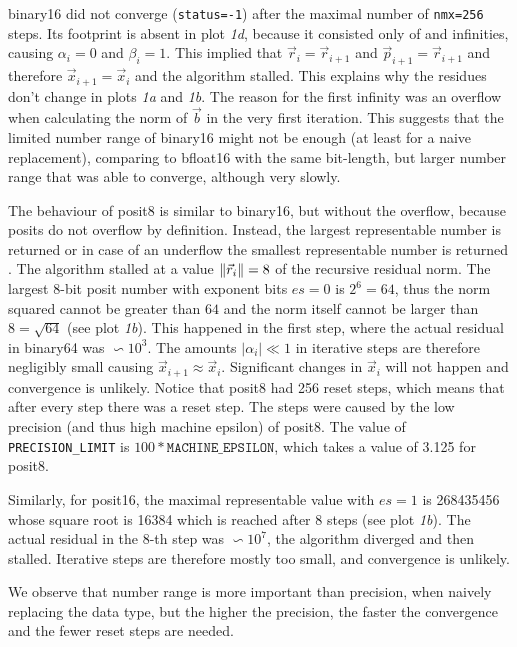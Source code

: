 \documentclass{article}
\theoremstyle{plain} %
\theoremstyle{convention} %
\theoremstyle{remark} %
\def\code#1{\texttt{#1}}
\numberwithin{equation}{section}
\begin{document}
\gls{binary16} did not converge (\code{status=-1}) after the maximal number of \code{nmx=256} steps. Its footprint is absent in plot \textit{1d}, because it consisted only of  and infinities, causing $\alpha_i = 0$ and $\beta_i = 1$. This implied that $\vec{r}_i = \vec{r}_{i+1}$ and $\vec{p}_{i+1} = \vec{r}_{i+1}$ and therefore $\vec{x}_{i+1} = \vec{x}_{i}$ and the algorithm stalled. This explains why the residues don't change in plots \textit{1a} and \textit{1b}. The reason for the first infinity was an overflow when calculating the norm of $\vec{b}$ in the very first iteration. This suggests that the limited number range of \gls{binary16} might not be enough (at least for a naive replacement), comparing to \gls{bfloat16} with the same bit-length, but larger number range that was able to converge, although very slowly.

The behaviour of \gls{posit8} is similar to \gls{binary16}, but without the overflow, because posits do not overflow by definition. Instead, the largest representable number is returned or in case of an underflow the smallest representable number is returned \cite{posit2018standard}. The algorithm stalled at a value $\norm{\vec{r}_i} = 8$ of the recursive residual norm. The largest \num{8}-bit posit number with exponent bits $es=0$ is $2^6 = 64$, thus the norm squared cannot be greater than $64$ and the norm itself cannot be larger than $8 = \sqrt{64}$ (see plot \textit{1b}). This happened in the first step, where the actual residual in \gls{binary64} was $\backsim 10^3$. The amounts $|\alpha_i| \ll 1$ in iterative steps are therefore negligibly small causing $\vec{x}_{i+1} \approx \vec{x}_i$. Significant changes in $\vec{x}_i$ will not happen and convergence is unlikely. Notice that \gls{posit8} had \num{256} reset steps, which means that after every step there was a reset step. The steps were caused by the low precision (and thus high machine epsilon) of \gls{posit8}. The value of \code{PRECISION\_LIMIT} is $100*\code{MACHINE\_EPSILON}$, which takes a value of \num{3.125} for \gls{posit8}.

Similarly, for \gls{posit16}, the maximal representable value with $es=1$ is \num{268435456} whose square root is \num{16384} which is reached after $8$ steps (see plot \textit{1b}). The actual residual in the $8$-th step was $\backsim 10^7$, the algorithm diverged and then stalled. Iterative steps are therefore mostly too small, and convergence is unlikely.

We observe that number range is more important than precision, when naively replacing the data type, but the higher the precision, the faster the convergence and the fewer reset steps are needed.
\end{document}
